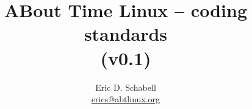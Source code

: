 \documentclass[a4paper]{article}
\begin{document}
\title{ABout Time Linux -- coding standards \\ (v0.1)}

\author{Eric D. Schabell \\ \url{erics@abtlinux.org}}

\maketitle




  
\end{document}
